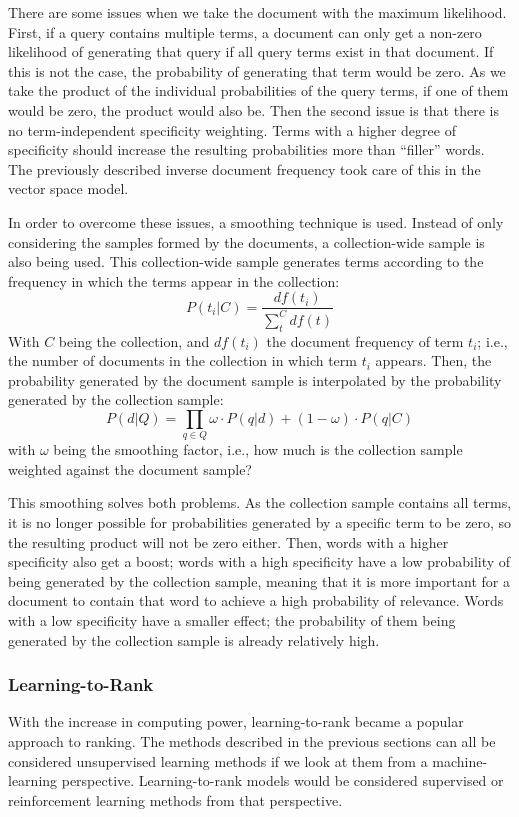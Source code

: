 There are some issues when we take the document with the maximum likelihood. First, if a query contains multiple terms, a document can only get a non-zero likelihood of generating that query if all query terms exist in that document. If this is not the case, the probability of generating that term would be zero. As we take the product of the individual probabilities of the query terms, if one of them would be zero, the product would also be. Then the second issue is that there is no term-independent specificity weighting. Terms with a higher degree of specificity should increase the resulting probabilities more than ``filler'' words. The previously described inverse document frequency took care of this in the vector space model.

In order to overcome these issues, a smoothing technique is used. Instead of only considering the samples formed by the documents, a collection-wide sample is also being used. This collection-wide sample generates terms according to the frequency in which the terms appear in the collection:
\begin{equation}
	P(t_i|C) = \frac{\mathit{df}(t_i)}{\sum_t^C \mathit{df}(t)}
\end{equation}
With $C$ being the collection, and $df(t_i)$ the document frequency of term $t_i$; i.e., the number of documents in the collection in which term $t_i$ appears. Then, the probability generated by the document sample is interpolated by the probability generated by the collection sample:
\begin{equation}
	P(d|Q) = \prod_{q \in Q} \omega \cdot P(q | d) + (1 - \omega) \cdot P(q | C) 
\end{equation}
with $\omega$ being the smoothing factor, i.e., how much is the collection sample weighted against the document sample?

This smoothing solves both problems. As the collection sample contains all terms, it is no longer possible for probabilities generated by a specific term to be zero, so the resulting product will not be zero either. Then, words with a higher specificity also get a boost; words with a high specificity have a low probability of being generated by the collection sample, meaning that it is more important for a document to contain that word to achieve a high probability of relevance. Words with a low specificity have a smaller effect; the probability of them being generated by the collection sample is already relatively high. 

\subsubsection{Learning-to-Rank}
With the increase in computing power, learning-to-rank became a popular approach to ranking. The methods described in the previous sections can all be considered unsupervised learning methods if we look at them from a machine-learning perspective. Learning-to-rank models would be considered supervised or reinforcement learning methods from that perspective. 

